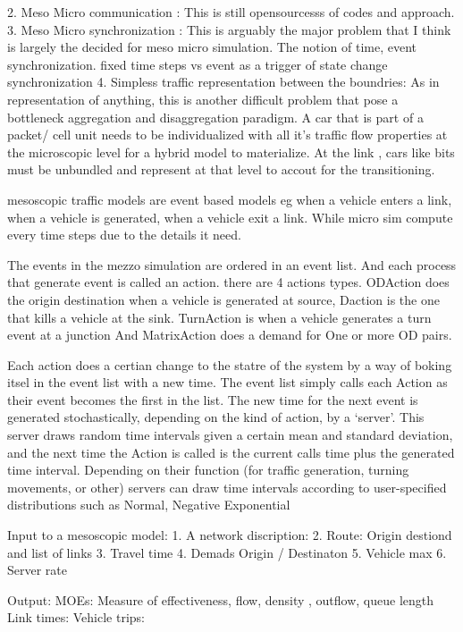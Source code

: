 \begin{bibunit}[plainnat]
2. Meso Micro communication : This is still opensourcesss of codes and approach.
3. Meso Micro synchronization : This is arguably the major problem that I think is largely the decided for
meso micro simulation. The notion of time, event synchronization. fixed time steps vs event as a trigger of state change synchronization
4. Simpless traffic representation between the boundries: As in representation of anything, this is another difficult problem that pose a bottleneck
aggregation and disaggregation paradigm. A car that is part of a packet/ cell unit needs to be individualized with 
all it's traffic flow properties at the microscopic level for a hybrid model to materialize. 
At the link , cars like bits must be unbundled and represent at that level to accout for the 
transitioning. 

mesoscopic traffic models are event based models eg when a vehicle enters a link, when a vehicle is generated, when a vehicle exit a link.
While micro sim compute every time steps due to the details it need. 


The events in the mezzo simulation are ordered in an event list. And each process that generate event is called an action. there are 4 actions types. 
ODAction does the origin destination when a vehicle is generated at source, Daction is the one that kills a vehicle at the sink. 
TurnAction is when a vehicle generates a turn event at a junction And MatrixAction does a demand for One or more OD pairs. 

Each action does a certian change to the statre of the system by a way of boking itsel in the event list with a new time. 
The event list simply calls each Action as their event becomes the first in the list.
The new time for the next event is generated stochastically, depending on the kind
of action, by a ‘server’. This server draws random time intervals given a certain
mean and standard deviation, and the next time the Action is called is the current
calls time plus the generated time interval. Depending on their function (for traffic
generation, turning movements, or other) servers can draw time intervals according
to user-specified distributions such as Normal, Negative Exponential


Input to a mesoscopic model: 
1. A network discription:
2. Route: Origin destiond and list of links
3. Travel time 
4. Demads Origin / Destinaton 
5. Vehicle max
6. Server rate

Output:
MOEs: Measure of effectiveness, flow, density , outflow, queue length 
Link times: 
Vehicle trips:



\end{bibunit}
